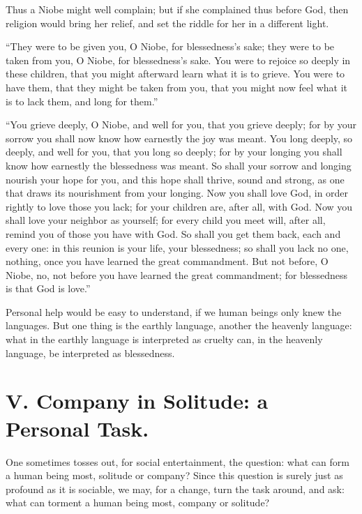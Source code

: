 \documentclass[12pt,a4paper]{book}
\begin{document}
Thus a Niobe might well complain; but if she complained thus before God, then religion would bring her relief, and set the riddle for her in a different light.

``They were to be given you, O Niobe, for blessedness's sake; they were to be taken from you, O Niobe, for blessedness's sake. You were to rejoice so deeply in these children, that you might afterward learn what it is to grieve. You were to have them, that they might be taken from you, that you might now feel what it is to lack them, and long for them.''

``You grieve deeply, O Niobe, and well for you, that you grieve deeply; for by your sorrow you shall now know how earnestly the joy was meant. You long deeply, so deeply, and well for you, that you long so deeply; for by your longing you shall know how earnestly the blessedness was meant. So shall your sorrow and longing nourish your hope for you, and this hope shall thrive, sound and strong, as one that draws its nourishment from your longing. Now you shall love God, in order rightly to love those you lack; for your children are, after all, with God. Now you shall love your neighbor as yourself; for every child you meet will, after all, remind you of those you have with God. So shall you get them back, each and every one: in this reunion is your life, your blessedness; so shall you lack no one, nothing, once you have learned the great commandment. But not before, O Niobe, no, not before you have learned the great commandment; for blessedness is that God is love.''

Personal help would be easy to understand, if we human beings only knew the languages. But one thing is the earthly language, another the heavenly language: what in the earthly language is interpreted as cruelty can, in the heavenly language, be interpreted as blessedness.

\chapter*{V. Company in Solitude: a Personal Task.}
\label{ch:forel5}

One sometimes tosses out, for social entertainment, the question: what can form a human being most, solitude or company? Since this question is surely just as profound as it is sociable, we may, for a change, turn the task around, and ask: what can torment a human being most, company or solitude?
\end{document}

